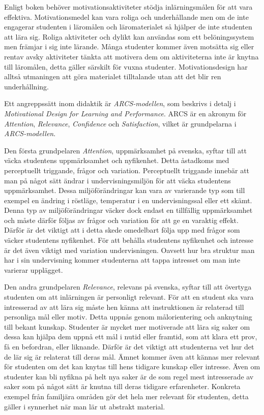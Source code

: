 \documentclass[12pt,a4paper,twoside,openright]{article}
\begin{document}
Enligt boken%
behöver motivations\-aktiviteter stödja inlärningsmålen för att vara
effektiva. Motivationsmedel kan vara roliga och underhållande men om
de inte engagerar studenten i läromålen och läromaterialet så hjälper
de inte studenten att lära sig. Roliga aktiviteter och dylikt kan
användas som ett belöningssystem men främjar i sig inte lärande. Många
studenter kommer även motsätta sig eller rentav avsky aktiviteter
tänkta att motivera dem om aktiviteterna inte är knytna till
läromålen, detta gäller särskilt för vuxna studenter.
Motivationsdesign har alltså utmaningen att göra materialet
tilltalande utan att det blir ren underhållning.

Ett angreppssätt inom didaktik är \textit{ARCS-modellen}, som beskrivs
i detalj i \textit{Motivational Design for Learning and Performance}.
ARCS är en akronym för \textit{Attention}, \textit{Relevance},
\textit{Confidence} och \textit{Satisfaction}, vilket är grundpelarna
i \textit{ARCS-modellen}.

Den första grundpelaren \textit{Attention}, uppmärksamhet på svenska,
syftar till att väcka studentens uppmärksamhet och nyfikenhet.
Detta åstadkoms med perceptuellt triggande, frågor och variation.
Perceptuellt triggande innebär att man på något sätt ändrar i
undervisningsmiljön för att väcka studentens uppmärksamhet. Dessa
miljöförändringar kan vara av varierande typ som till exempel en
ändring i röstläge, temperatur i en undervisningssal eller ett skämt.
Denna typ av miljöförändringar väcker dock endast en tillfällig
uppmärksamhet och måste därför följas av frågor och variation för att
ge en varaktig effekt. Därför är det viktigt att i detta skede
omedelbart följa upp med frågor som väcker studentens nyfikenhet. För
att behålla studentens nyfikenhet och intresse är det även viktigt med
variation undervisningen. Oavsett hur bra struktur man har i sin
undervisning kommer studenterna att tappa intresset om man inte
varierar upplägget.

Den andra grundpelaren \textit{Relevance}, relevans på svenska, syftar
till att övertyga studenten om att inlärningen är personligt relevant.
För att en student ska vara intresserad av att lära sig måste hen
känna att instruktionen är relaterad till personliga mål eller motiv.
Detta uppnås genom målorientering och anknytning till bekant kunskap.
Studenter är mycket mer motiverade att lära sig saker om dessa kan
hjälpa dem uppnå ett mål i nutid eller framtid, som att klara ett
prov, få en befordran, eller liknande. Därför är det viktigt att
studenterna vet hur det de lär sig är relaterat till deras mål. Ämnet
kommer även att kännas mer relevant för studenten om det kan knytas
till hens tidigare kunskap eller intresse. Även om studenter kan bli
nyfikna på helt nya saker är de som regel mest intresserade av saker
som på något sätt är knutna till deras tidigare erfarenheter.
Konkreta exempel från familjära områden gör det hela mer relevant för
studenten, detta gäller i synnerhet när man lär ut abstrakt material.
\end{document}
